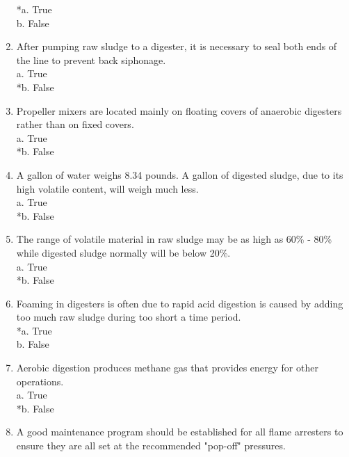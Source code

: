 \documentclass{article}
\begin{document}
\begin{enumerate}
*a. True \\
b. False \\

\item  After pumping raw sludge to a digester, it is necessary to seal both ends of the line to prevent back siphonage. \\

a. True \\
*b. False \\

\item  Propeller mixers are located mainly on floating covers of anaerobic digesters rather than on fixed covers. \\

a. True \\
*b. False \\

\item  A gallon of water weighs 8.34 pounds.  A gallon of digested sludge, due to its high volatile content, will weigh much less. \\

a. True \\
*b. False \\

\item  The range of volatile material in raw sludge may be as high as 60\% - 80\% while digested sludge normally will be below 20\%. \\

a. True \\
*b. False \\

\item  Foaming in digesters is often due to rapid acid digestion is caused by adding too much raw sludge during too short a time period. \\

*a. True \\
b. False \\

\item  Aerobic digestion produces methane gas that provides energy for other operations. \\

a. True \\
*b. False \\

\item  A good maintenance program should be established for all flame arresters to ensure they are all set at the recommended "pop-off" pressures. \\


\end{enumerate}
\end{document}
